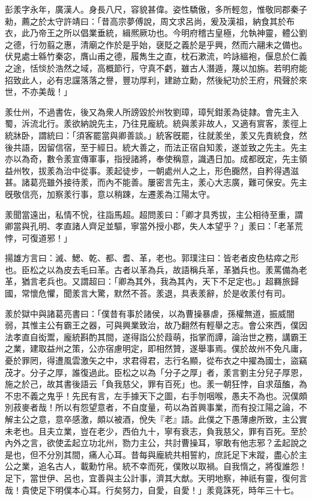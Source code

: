 
\begin{pinyinscope}
彭羕字永年，廣漢人。身長八尺，容貌甚偉。姿性驕傲，多所輕忽，惟敬同郡秦子勑，薦之於太守許靖曰：「昔高宗夢傅說，周文求呂尚，爰及漢祖，納食其於布衣，此乃帝王之所以倡業垂統，緝熈厥功也。今明府稽古皇極，允執神靈，體公劉之德，行勿翦之惠，清廟之作於是乎始，襃貶之義於是乎興，然而六翮未之備也。伏見處士緜竹秦宓，膺山甫之德，履雋生之直，枕石漱流，吟詠縕袍，偃息於仁義之途，恬惔於浩然之域，高概節行，守真不虧，雖古人潛遁，蔑以加旃。若明府能招致此人，必有忠讜落落之譽，豐功厚利，建跡立勳，然後紀功於王府，飛聲於來世，不亦美哉！」

羕仕州，不過書佐，後又為衆人所謗毀於州牧劉璋，璋髠鉗羕為徒隷。會先主入蜀，泝流北行。羕欲納說先主，乃往見龐統。統與羕非故人，又適有賔客，羕徑上統牀卧，謂統曰：「須客罷當與卿善談。」統客旣罷，往就羕坐，羕又先責統食，然後共語，因留信宿，至于經日。統大善之，而法正宿自知羕，遂並致之先主。先主亦以為奇，數令羕宣傳軍事，指授諸將，奉使稱意，識遇日加。成都旣定，先主領益州牧，拔羕為治中從事。羕起徒步，一朝處州人之上，形色嚻然，自矜得遇滋甚。諸葛亮雖外接待羕，而內不能善。屢密言先主，羕心大志廣，難可保安。先主旣敬信亮，加察羕行事，意以稍踈，左遷羕為江陽太守。

羕聞當遠出，私情不恱，往詣馬超。超問羕曰：「卿才具秀拔，主公相待至重，謂卿當與孔明、孝直諸人齊足並驅，寧當外授小郡，失人本望乎？」羕曰：「老革荒悖，可復道邪！」

揚雄方言曰：滅、鰓、乾、都、耆、革，老也。郭璞注曰：皆老者皮色枯瘁之形也。臣松之以為皮去毛曰革。古者以革為兵，故語稱兵革，革猶兵也。羕罵備為老革，猶言老兵也。又謂超曰：「卿為其外，我為其內，天下不足定也。」超羇旅歸國，常懷危懼，聞羕言大驚，默然不荅。羕退，具表羕辭，於是收羕付有司。

羕於獄中與諸葛亮書曰：「僕昔有事於諸侯，以為曹操暴虐，孫權無道，振威闇弱，其惟主公有霸王之器，可與興業致治，故乃翻然有輕舉之志。會公來西，僕因法孝直自衒鬻，龐統斟酌其間，遂得詣公於葭萌，指掌而譚，論治世之務，講霸王之業，建取益州之策，公亦宿慮明定，即相然贊，遂舉事焉。僕於故州不免凡庸，憂於罪罔，得遭風雲激矢之中，求君得君，志行名顯，從布衣之中擢為國士，盜竊茂才。分子之厚，誰復過此。臣松之以為「分子之厚」者，羕言劉主分兒子厚恩，施之於己，故其書後語云「負我慈父，罪有百死」也。羕一朝狂悖，自求葅醢，為不忠不義之鬼乎！先民有言，左手據天下之圖，右手刎咽喉，愚夫不為也。況僕頗別菽麥者哉！所以有怨望意者，不自度量，苟以為首興事業，而有投江陽之論，不解主公之意，意卒感激，頗以被酒，侻失『老』語。此僕之下愚薄慮所致，主公實未老也。且夫立業，豈在老少，西伯九十，寧有衰志，負我慈父，罪有百死。至於內外之言，欲使孟起立功北州，勠力主公，共討曹操耳，寧敢有他志邪？孟起說之是也，但不分別其間，痛人心耳。昔每與龐統共相誓約，庶託足下末蹤，盡心於主公之業，追名古人，載勳竹帛。統不幸而死，僕敗以取禍。自我惰之，將復誰怨！足下，當世伊、呂也，宜善與主公計事，濟其大猷。天明地察，神祇有靈，復何言哉！貴使足下明僕本心耳。行矣努力，自愛，自愛！」羕竟誅死，時年三十七。


\end{pinyinscope}